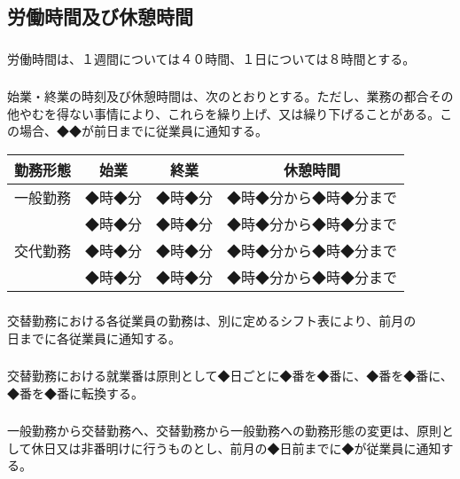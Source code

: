 \documentclass{jsarticle}
\begin{document}
\subsection{労働時間及び休憩時間}
\label{就規_条_労働時間及び休憩時間}
\subsubsection{}
\label{就規_項_労働時間及び休憩時間}
労働時間は、１週間については４０時間、１日については８時間とする。
\subsubsection{}
\label{就規_項_始業・終業の時刻及び休憩時間}
始業・終業の時刻及び休憩時間は、次のとおりとする。ただし、業務の都合その他やむを得ない事情により、これらを繰り上げ、又は繰り下げることがある。この場合、◆◆が前日までに従業員に通知する。
  \begin{table}[htb]
    \centering
    \begin{tabular}{|c|c|c|c|} \hline
      勤務形態 & 始業 & 終業 & 休憩時間 \\ \hline \hline
      一般勤務 & ◆時◆分 & ◆時◆分 & ◆時◆分から◆時◆分まで \\ \hline
               & ◆時◆分 & ◆時◆分 & ◆時◆分から◆時◆分まで \\ \cline{2-4}
      交代勤務 & ◆時◆分 & ◆時◆分 & ◆時◆分から◆時◆分まで \\ \cline{2-4}
               & ◆時◆分 & ◆時◆分 & ◆時◆分から◆時◆分まで \\ \hline
    \end{tabular}
  \end{table}
\subsubsection{}
\label{就規_項_交替勤務のシフト通知}
交替勤務における各従業員の勤務は、別に定めるシフト表により、前月の　　　日までに各従業員に通知する。
\subsubsection{}
\label{就規_項_交替勤務における就業番}
交替勤務における就業番は原則として◆日ごとに◆番を◆番に、◆番を◆番に、◆番を◆番に転換する。
\subsubsection{}
\label{就規_項_一般勤務と交替勤務との変更}
一般勤務から交替勤務へ、交替勤務から一般勤務への勤務形態の変更は、原則として休日又は非番明けに行うものとし、前月の◆日前までに◆が従業員に通知する。
\end{document}
